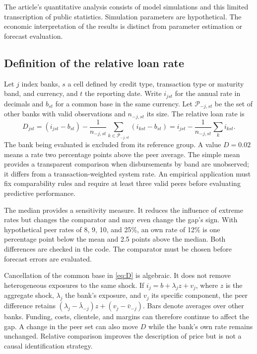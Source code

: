 \documentclass[11pt]{article}
\theoremstyle{definition}\newtheorem{assumption}{Assumption}
\begin{document}
The article's quantitative analysis consists of model simulations and this
limited transcription of public statistics. Simulation parameters are
hypothetical. The economic interpretation of the results is distinct from
parameter estimation or forecast evaluation.

\subsection{Definition of the relative loan rate}
Let $j$ index banks, $s$ a cell defined by credit type, transaction type or
maturity band, and currency, and $t$ the reporting date. Write $i_{jst}$ for
the annual rate in decimals and $b_{st}$ for a common base in the same
currency. Let $\mathcal P_{-j,st}$ be the set of other banks with valid
observations and $n_{-j,st}$ its size. The relative loan rate is
\begin{equation}\label{eq:D}
D_{jst}=(i_{jst}-b_{st})-
\frac{1}{n_{-j,st}}\sum_{k\in\mathcal P_{-j,st}}(i_{kst}-b_{st})
=i_{jst}-\frac{1}{n_{-j,st}}\sum_k i_{kst}.
\end{equation}
The bank being evaluated is excluded from its reference group. A value
$D=0.02$ means a rate two percentage points above the peer average. The
simple mean provides a transparent comparison when disbursements by band
are unobserved; it differs from a transaction-weighted system rate. An
empirical application must fix comparability rules and require at least
three valid peers before evaluating predictive performance.

The median provides a sensitivity measure. It reduces the influence of
extreme rates but changes the comparator and may even change the gap's sign.
With hypothetical peer rates of 8, 9, 10, and 25\%, an own rate of 12\% is
one percentage point below the mean and 2.5 points above the median. Both
differences are checked in the code. The comparator must be chosen before
forecast errors are evaluated.

Cancellation of the common base in \eqref{eq:D} is algebraic. It does not
remove heterogeneous exposures to the same shock. If
$i_j=b+\lambda_j z+v_j$, where $z$ is the aggregate shock, $\lambda_j$ the
bank's exposure, and $v_j$ its specific component, the peer difference retains
$(\lambda_j-\bar\lambda_{-j})z+(v_j-\bar v_{-j})$. Bars denote averages over
other banks. Funding, costs, clientele, and margins can therefore continue
to affect the gap. A change in the peer set can also move $D$ while the
bank's own rate remains unchanged. Relative comparison improves the
description of price but is not a causal identification strategy.
\end{document}
